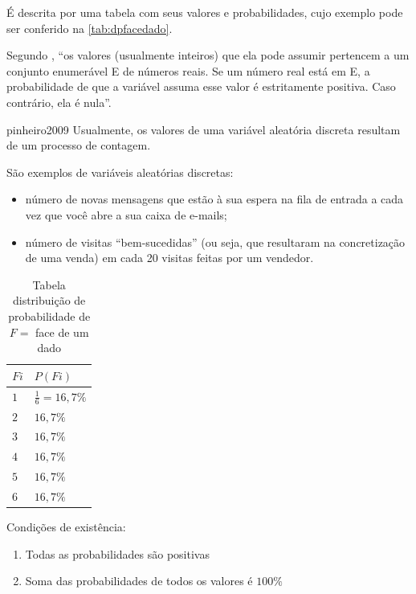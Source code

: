 \documentclass[a4paper]{article}
\begin{document}
	É descrita por uma tabela com seus valores e probabilidades, cujo exemplo pode ser conferido na \autoref{tab:dpfacedado}.
	
	Segundo , ``os valores (usualmente inteiros) que ela pode assumir pertencem a um conjunto enumerável E de números reais. Se um número real está em E, a probabilidade de que a variável assuma esse valor é estritamente positiva. Caso contrário, ela é nula''.
	
	\begin{displaycquote}[p. 98]{pinheiro2009}
	Usualmente, os valores de uma variável aleatória discreta resultam de um processo de contagem.
	
	São exemplos de variáveis aleatórias discretas:
	
		\begin{itemize}
			\item número de novas mensagens que estão à sua espera na fila de entrada a cada vez
			que você abre a sua caixa de e-mails;
			\item número de visitas ``bem-sucedidas'' (ou seja, que resultaram na concretização de
			uma venda) em cada 20 visitas feitas por um vendedor.
		\end{itemize}
	\end{displaycquote}
	
	\begin{table}[]
		\centering
		\caption{Tabela distribuição de probabilidade de $F =$ face de um dado}
		\label{tab:dpfacedado}
		\begin{tabular}{l|l}
			\textbf{$Fi$} & \textbf{$P(Fi)$} \\ \hline
			$1$ & $\frac{1}{6}=16,7\%$ \\
			$2$ & $16,7\%$ \\
			$3$ & $16,7\%$ \\
			$4$ & $16,7\%$ \\
			$5$ & $16,7\%$ \\
			$6$ & $16,7\%$
		\end{tabular}
	\end{table}

	Condições de existência:
	
	\begin{enumerate}
		\item Todas as probabilidades são positivas
		\item Soma das probabilidades de todos os valores é $100\%$
	\end{enumerate}
	
\end{document}
